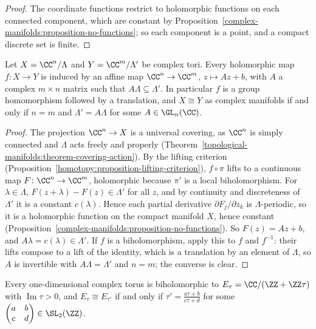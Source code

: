 \begin{proof}
The coordinate functions restrict to holomorphic functions on each connected component, which are constant by Proposition~\ref{complex-manifolds:proposition-no-functions}; so each component is a point, and a compact discrete set is
finite.
\end{proof}

\begin{theorem}\label{complex-manifolds:theorem-maps-of-tori}
Let $X = \CC^n/\Lambda$ and $Y = \CC^m/\Lambda'$ be complex tori. Every holomorphic map $f \colon X \to Y$ is induced by an affine map $\CC^n \to \CC^m$, $z \mapsto Az + b$, with $A$ a complex $m \times n$ matrix such that
$A\Lambda \subseteq \Lambda'$. In particular $f$ is a group homomorphism followed by a translation, and $X \cong Y$ as complex manifolds if and only if $n = m$ and $\Lambda' = A\Lambda$ for some $A \in \GL_n(\CC)$.
\end{theorem}

\begin{proof}
The projection $\CC^n \to X$ is a universal covering, as $\CC^n$ is simply connected and $\Lambda$ acts freely and properly (Theorem~\ref{topological-manifolds:theorem-covering-action}). By the lifting criterion
(Proposition~\ref{homotopy:proposition-lifting-criterion}), $f \circ \pi$ lifts to a continuous map $F \colon \CC^n \to \CC^m$, holomorphic because $\pi'$ is a local biholomorphism. For $\lambda \in \Lambda$, $F(z + \lambda) - F(z) \in \Lambda'$ for all
$z$, and by continuity and discreteness of $\Lambda'$ it is a constant $c(\lambda)$. Hence each partial derivative $\partial F_j/\partial z_k$ is $\Lambda$-periodic, so it is a holomorphic function on the compact manifold $X$, hence constant
(Proposition~\ref{complex-manifolds:proposition-no-functions}). So $F(z) = Az + b$, and $A\lambda = c(\lambda) \in \Lambda'$. If $f$ is a biholomorphism, apply this to $f$ and $f^{-1}$: their lifts compose to a lift of the identity, which is
a translation by an element of $\Lambda$, so $A$ is invertible with $A\Lambda = \Lambda'$ and $n = m$; the converse is clear.
\end{proof}

\begin{corollary}\label{complex-manifolds:corollary-elliptic-curves}
Every one-dimensional complex torus is biholomorphic to $E_\tau = \CC/(\ZZ + \ZZ\tau)$ with $\operatorname{Im}\tau > 0$, and $E_\tau \cong E_{\tau'}$ if and only if $\tau' = \frac{a\tau + b}{c\tau + d}$ for some
$\begin{pmatrix}a & b\\ c & d\end{pmatrix} \in \SL_2(\ZZ)$.
\end{corollary}

